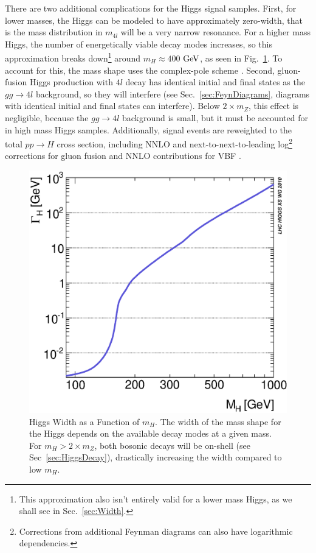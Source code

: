 There are two additional complications for the Higgs signal samples. First, for lower masses, the Higgs can be modeled to have approximately zero-width, that is the mass distribution in $m_{4l}$ will be a very narrow resonance. For a higher mass Higgs, the number of energetically viable decay modes increases, so this approximation breaks down\footnote{This approximation also isn't entirely valid for a lower mass Higgs, as we shall see in Sec.~\ref{sec:Width}.} around $m_H \approx 400$ $\rm{GeV}$, as seen in Fig.~\ref{fig:HiggsWidth}. To account for this, the mass shape uses the complex-pole scheme \cite{Passarino:2010qk,Goria:2011wa,Kauer:2012hd}. Second, gluon-fusion Higgs production with $4l$ decay has identical initial and final states as the $gg\rightarrow 4l$ background, so they will interfere (see Sec.~\ref{sec:FeynDiagrams}, diagrams with identical initial and final states can interfere). Below $2\times m_Z$, this effect is negligible, because the $gg\rightarrow 4l$ background is small, but it must be accounted for in high mass Higgs samples. Additionally, signal events are reweighted to the total $pp\rightarrow H$ cross section, including NNLO and next-to-next-to-leading log\footnote{Corrections from additional Feynman diagrams can also have logarithmic dependencies.} corrections for gluon fusion \cite{deFlorian:2012mx,Anastasiou:2008tj,deFlorian:2009hc,Baglio:2010ae,HXSWG_Observables,Djouadi:1991tka,Dawson:1990zj,Spira:1995rr,Harlander:2002wh,Anastasiou:2002yz,Ravindran:2003um,Catani:2003zt,Actis:2008ug} and NNLO contributions for VBF \cite{HXSWG_Observables,Ciccolini:2007jr,Ciccolini:2007ec,Figy:2003nv,Arnold:2008rz,Bolzoni:2010xr}.

\begin{figure}[htbp]
\begin{center}
\includegraphics[width=.5\linewidth]{HiggsDiscovery/figures/HiggsWidth}
\caption[Higgs Width as a Function of $m_H$]{Higgs Width as a Function of $m_H$. The width of the mass shape for the Higgs depends on the available decay modes at a given mass. For $m_H > 2\times m_Z$, both bosonic decays will be on-shell (see Sec~\ref{sec:HiggsDecay}), drastically increasing the width compared to low $m_H$.}
\label{fig:HiggsWidth}
\end{center}
\end{figure}

